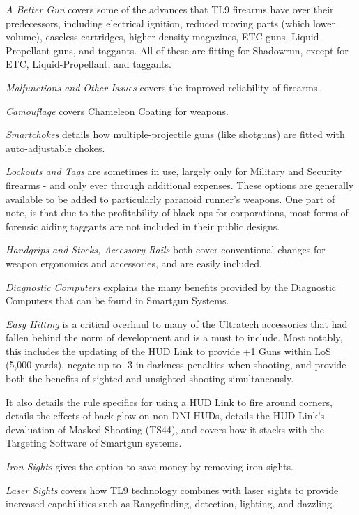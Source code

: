 \begin{multicols}{2}
	\textit{A Better Gun} covers some of the advances that TL9 firearms have over their predecessors, including electrical ignition, reduced moving parts (which lower volume), caseless cartridges, higher density magazines, ETC guns, Liquid-Propellant guns, and taggants. All of these are fitting for Shadowrun, except for ETC, Liquid-Propellant, and taggants.
	
	\textit{Malfunctions and Other Issues} covers the improved reliability of firearms.
	
	\textit{Camouflage} covers Chameleon Coating for weapons.
	
	\textit{Smartchokes} details how multiple-projectile guns (like shotguns) are fitted with auto-adjustable chokes.
	
	\textit{Lockouts and Tags} are sometimes in use, largely only for Military and Security firearms - and only ever through additional expenses. These options are generally available to be added to particularly paranoid runner's weapons. One part of note, is that due to the profitability of black ops for corporations, most forms of forensic aiding taggants are not included in their public designs.
	
	\textit{Handgrips and Stocks, Accessory Rails} both cover conventional changes for weapon ergonomics and accessories, and are easily included.
	
	\textit{Diagnostic Computers} explains the many benefits provided by the Diagnostic Computers that can be found in Smartgun Systems.
	
	\textit{Easy Hitting} is a critical overhaul to many of the Ultratech accessories that had fallen behind the norm of development and is a must to include. Most notably, this includes the updating of the HUD Link to provide +1 Guns within LoS (5,000 yards), negate up to -3 in darkness penalties when shooting, and provide both the benefits of sighted and unsighted shooting simultaneously. 
	
	It also details the rule specifics for using a HUD Link to fire around corners, details the effects of back glow on non DNI HUDs, details the HUD Link's devaluation of Masked Shooting (TS44), and covers how it stacks with the Targeting Software of Smartgun systems.
	
	\textit{Iron Sights} gives the option to save money by removing iron sights.
	
	\textit{Laser Sights} covers how TL9 technology combines with laser sights to provide increased capabilities such as Rangefinding, detection, lighting, and dazzling.
	

\end{multicols}
